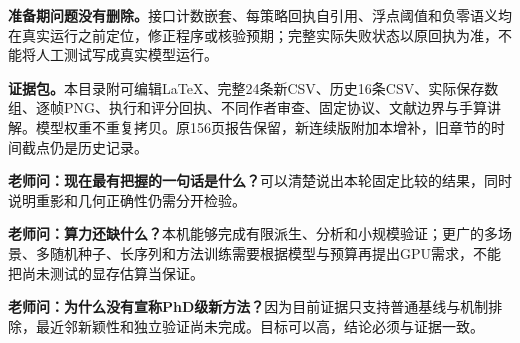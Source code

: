 \documentclass[UTF8,10pt,a4paper]{ctexart}
\begin{document}
\textbf{准备期问题没有删除。}接口计数嵌套、每策略回执自引用、浮点阈值和负零语义均在真实运行之前定位，修正程序或核验预期；完整实际失败状态以原回执为准，不能将人工测试写成真实模型运行。

\textbf{证据包。}本目录附可编辑LaTeX、完整24条新CSV、历史16条CSV、实际保存数组、逐帧PNG、执行和评分回执、不同作者审查、固定协议、文献边界与手算讲解。模型权重不重复拷贝。原156页报告保留，新连续版附加本增补，旧章节的时间截点仍是历史记录。

\textbf{老师问：现在最有把握的一句话是什么？}可以清楚说出本轮固定比较的结果，同时说明重影和几何正确性仍需分开检验。

\textbf{老师问：算力还缺什么？}本机能够完成有限派生、分析和小规模验证；更广的多场景、多随机种子、长序列和方法训练需要根据模型与预算再提出GPU需求，不能把尚未测试的显存估算当保证。

\textbf{老师问：为什么没有宣称PhD级新方法？}因为目前证据只支持普通基线与机制排除，最近邻新颖性和独立验证尚未完成。目标可以高，结论必须与证据一致。
\end{document}
